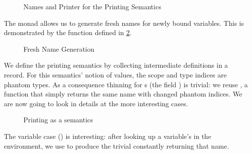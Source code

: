 \begin{figure}[h]
\begin{minipage}[t]{0.6\textwidth}
\end{minipage}
\begin{minipage}[t]{0.4\textwidth}
\end{minipage}

\begin{minipage}[t]{0.5\textwidth}
\end{minipage}
\begin{minipage}[t]{0.5\textwidth}
\end{minipage}
\caption{Names and Printer for the Printing Semantics\label{fig:semprint}}
\end{figure}

The monad  allows us to generate fresh names for newly bound
variables. This is demonstrated by the function  defined in
\cref{fig:freshname}.

\begin{figure}[h]
\caption{Fresh Name Generation\label{fig:freshname}}
\end{figure}

We define the printing semantics by collecting intermediate definitions in
a record. For this semantics' notion of values, the scope and type indices
are phantom types. As a consequence thinning for s (the field
) is trivial: we reuse ,
a function that simply returns the same name with changed phantom indices.
We are now going to look in details at the more interesting cases.

\begin{figure}[h]
  \caption{Printing as a semantics}
\end{figure}

%
The variable case () is interesting: after looking up a
variable's  in the environment, we use  to produce the
trivial  constantly returning that name.


